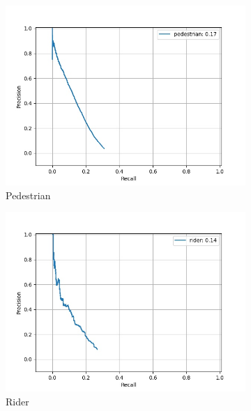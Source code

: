     \begin{figure}[H]
    	\centering
    	\begin{subfigure}[t]{0.325\textwidth}
    		\centering
    		\includegraphics[width=\textwidth]{images/sub_ens_pr/class_pedestrian_pr.jpg}
    		\caption{Pedestrian}
    	\end{subfigure}
    	\begin{subfigure}[t]{0.325\textwidth}
    		\centering
    		\includegraphics[width=\textwidth]{images/sub_ens_pr/class_rider_pr.jpg}
    		\caption{Rider}
    	\end{subfigure}
    	\begin{subfigure}[t]{0.325\textwidth}
    		\centering

\end{subfigure}
\end{figure}

